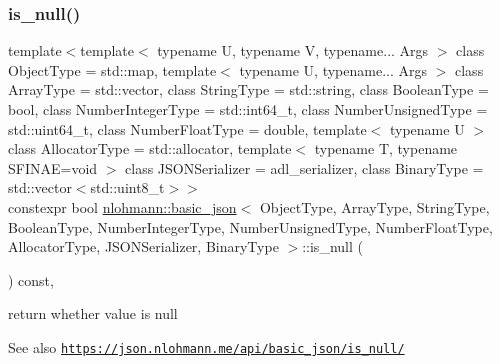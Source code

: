 \subsubsection{\texorpdfstring{is\+\_\+null()}{is\_null()}}
{\footnotesize\ttfamily template$<$template$<$ typename U, typename V, typename... Args $>$ class Object\+Type = std\+::map, template$<$ typename U, typename... Args $>$ class Array\+Type = std\+::vector, class String\+Type  = std\+::string, class Boolean\+Type  = bool, class Number\+Integer\+Type  = std\+::int64\+\_\+t, class Number\+Unsigned\+Type  = std\+::uint64\+\_\+t, class Number\+Float\+Type  = double, template$<$ typename U $>$ class Allocator\+Type = std\+::allocator, template$<$ typename T, typename S\+F\+I\+N\+A\+E=void $>$ class J\+S\+O\+N\+Serializer = adl\+\_\+serializer, class Binary\+Type  = std\+::vector$<$std\+::uint8\+\_\+t$>$$>$ \\
constexpr bool \hyperlink{classnlohmann_1_1basic__json}{nlohmann\+::basic\+\_\+json}$<$ Object\+Type, Array\+Type, String\+Type, Boolean\+Type, Number\+Integer\+Type, Number\+Unsigned\+Type, Number\+Float\+Type, Allocator\+Type, J\+S\+O\+N\+Serializer, Binary\+Type $>$\+::is\+\_\+null (\begin{DoxyParamCaption}{ }\end{DoxyParamCaption}) const\hspace{0.3cm}{\ttfamily [inline]}, {\ttfamily [noexcept]}}



return whether value is null 

\begin{DoxySeeAlso}{See also}
\href{https://json.nlohmann.me/api/basic_json/is_null/}{\tt https\+://json.\+nlohmann.\+me/api/basic\+\_\+json/is\+\_\+null/} 
\end{DoxySeeAlso}
\mbox{\label{classnlohmann_1_1basic__json_abd47ac8eba63833152795280f75b5851}} 
